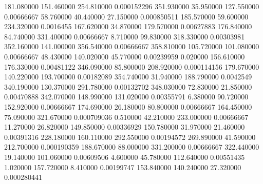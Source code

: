 181.080000	151.460000	254.810000	0.000152296
351.930000	35.950000	127.550000	0.00666667
58.760000	40.440000	27.150000	0.000850511
185.570000	59.600000	234.320000	0.0016455
167.620000	34.870000	179.570000	0.00627883
176.840000	84.740000	331.400000	0.00666667
8.710000	99.830000	318.330000	0.00303981
352.160000	141.000000	356.540000	0.00666667
358.810000	105.720000	101.080000	0.00666667
48.430000	140.020000	45.770000	0.00239959
0.020000	156.610000	176.330000	0.00481122
346.090000	85.800000	208.920000	0.000114156
179.670000	140.220000	193.700000	0.00182089
354.740000	31.940000	188.790000	0.0042549
340.190000	130.370000	291.780000	0.00132702
348.030000	72.830000	21.850000	0.00470888
342.070000	148.990000	131.020000	0.00355791
6.380000	90.720000	152.920000	0.00666667
174.690000	26.180000	80.800000	0.00666667
164.450000	75.090000	321.670000	0.000709036
0.510000	42.210000	233.000000	0.00666667
11.270000	26.820000	149.850000	0.00336929
150.780000	31.970000	21.460000	0.00391316
228.180000	160.110000	292.550000	0.00194572
269.890000	41.590000	212.700000	0.000190359
188.670000	88.000000	331.200000	0.00666667
322.440000	19.140000	101.060000	0.00609506
4.600000	45.780000	112.640000	0.00551435
1.020000	157.720000	8.410000	0.00199747
153.840000	140.240000	27.320000	0.000280441
